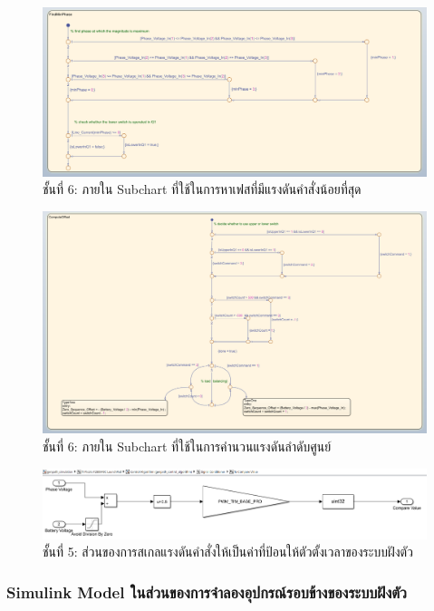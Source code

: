 \documentclass[11pt,a4paper]{article}
\begin{document}
\begin{figure}[H]
    \centering
    \includegraphics[width=\textwidth]{tam-fqt-l2-2.png}
    \caption{ชั้นที่ 6: ภายใน Subchart ที่ใช้ในการหาเฟสที่มีแรงดันคำสั่งน้อยที่สุด}
\end{figure}

\begin{figure}[H]
    \centering
    \includegraphics[width=\textwidth]{tam-fqt-l2-3.png}
    \caption{ชั้นที่ 6: ภายใน Subchart ที่ใช้ในการคำนวนแรงดันลำดับศูนย์}
\end{figure}

\begin{figure}[H]
    \centering
    \includegraphics[width=\textwidth]{l5-to-cmp.png}
    \caption{ชั้นที่ 5: ส่วนของการสเกลแรงดันคำสั่งให้เป็นค่าที่ป้อนให้ตัวตั้งเวลาของระบบฝังตัว}
\end{figure}

\subsubsection{Simulink Model ในส่วนของการจำลองอุปกรณ์รอบข้างของระบบฝังตัว}
\end{document}
